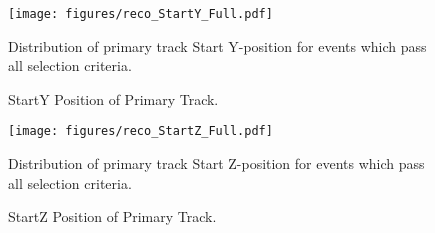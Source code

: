 \begin{figure}
\centering
\texttt{[image: figures/reco\_StartY\_Full.pdf]}
\caption{StartY Position of Primary Track.}
{Distribution of primary track Start Y-position for events which pass all selection criteria.  }
\label{fig:starty}
\end{figure}

\begin{figure}
\centering
\texttt{[image: figures/reco\_StartZ\_Full.pdf]}
\caption{StartZ Position of Primary Track.}
{Distribution of primary track Start Z-position for events which pass all selection criteria.  }
\label{fig:startz}
\end{figure}
